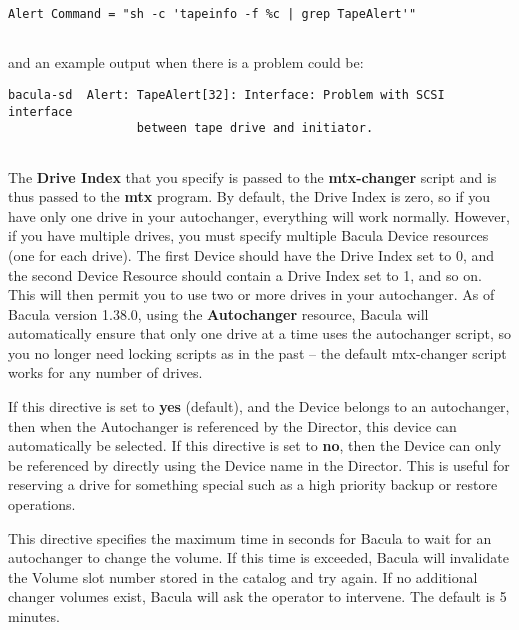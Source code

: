 \begin{description}
\footnotesize
\begin{verbatim}
Alert Command = "sh -c 'tapeinfo -f %c | grep TapeAlert'"
      
\end{verbatim}
\normalsize

and an example output when there is a problem could be:  

\footnotesize
\begin{verbatim}
bacula-sd  Alert: TapeAlert[32]: Interface: Problem with SCSI interface
                  between tape drive and initiator.
      
\end{verbatim}
\normalsize

\item [Drive Index = {\it number}]
   The {\bf Drive Index} that you specify is passed to the {\bf
   mtx-changer} script and is thus passed to the {\bf mtx} program.  By
   default, the Drive Index is zero, so if you have only one drive in your
   autochanger, everything will work normally.  However, if you have
   multiple drives, you must specify multiple Bacula Device resources (one
   for each drive).  The first Device should have the Drive Index set to 0,
   and the second Device Resource should contain a Drive Index set to 1,
   and so on.  This will then permit you to use two or more drives in your
   autochanger.  As of Bacula version 1.38.0, using the {\bf Autochanger}
   resource, Bacula will automatically ensure that only one drive at a time
   uses the autochanger script, so you no longer need locking scripts as in
   the past -- the default mtx-changer script works for any number of
   drives.

\item [Autoselect = {\it yes\vb{}no}]
   If this directive is set to {\bf yes} (default), and the Device
   belongs to an autochanger, then when the Autochanger is referenced
   by the Director, this device can automatically be selected. If this
   directive is set to {\bf no}, then the Device can only be referenced
   by directly using the Device name in the Director. This is useful
   for reserving a drive for something special such as a high priority
   backup or restore operations.

\item [Maximum Changer Wait = {\it time}]
   This directive specifies the maximum time in seconds for Bacula to wait
   for an autochanger to change the volume.  If this time is exceeded,
   Bacula will invalidate the Volume slot number stored in the catalog and
   try again.  If no additional changer volumes exist, Bacula will ask the
   operator to intervene.  The default is 5 minutes.      


\end{description}
